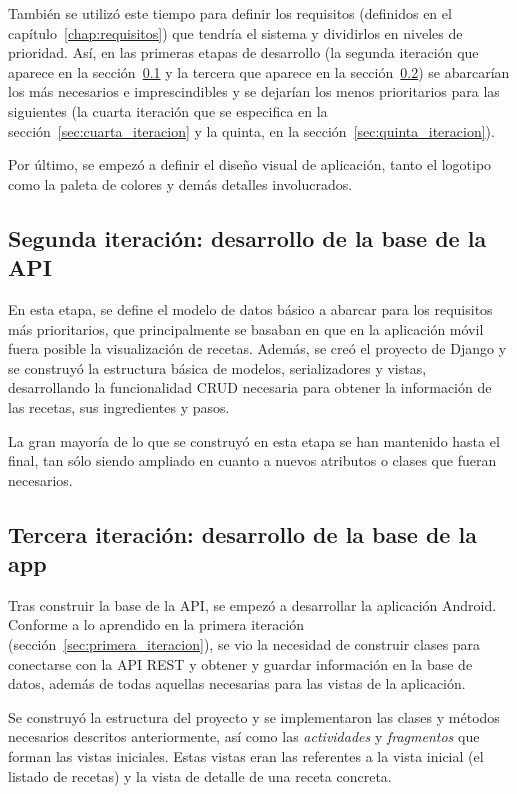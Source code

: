 También se utilizó este tiempo para definir los requisitos (definidos en el
capítulo~\ref{chap:requisitos}) que tendría el sistema y dividirlos en niveles
de prioridad. Así, en las primeras etapas de desarrollo (la segunda iteración que
aparece en la sección~\ref{sec:segunda_iteracion} y la tercera que aparece en la
sección~\ref{sec:tercera_iteracion}) se abarcarían los más necesarios e
imprescindibles y se dejarían los menos prioritarios para las siguientes (la
cuarta iteración que se especifica en la sección~\ref{sec:cuarta_iteracion} y
la quinta, en la sección~\ref{sec:quinta_iteracion}).

Por último, se empezó a definir el diseño visual de aplicación, tanto el
logotipo como la paleta de colores y demás detalles involucrados.


\subsection{Segunda iteración: desarrollo de la base de la API}
\label{sec:segunda_iteracion}

En esta etapa, se define el modelo de datos básico a abarcar para los requisitos
más prioritarios, que principalmente se basaban en que en la aplicación móvil
fuera posible la visualización de recetas. Además, se creó el proyecto de Django
y se construyó la estructura básica de modelos, serializadores y vistas,
desarrollando la funcionalidad CRUD necesaria para obtener la información de las
recetas, sus ingredientes y pasos.

La gran mayoría de lo que se construyó en esta etapa se han mantenido hasta el
final, tan sólo siendo ampliado en cuanto a nuevos atributos o clases que fueran
necesarios.


\subsection{Tercera iteración: desarrollo de la base de la app}
\label{sec:tercera_iteracion}

Tras construir la base de la API, se empezó a desarrollar la aplicación Android.
Conforme a lo aprendido en la primera iteración
(sección~\ref{sec:primera_iteracion}), se vio la necesidad de construir clases
para conectarse con la API \ac{REST} y obtener y guardar información
en la base de datos, además de todas aquellas necesarias para las vistas de la
aplicación.

Se construyó la estructura del proyecto y se implementaron las clases y métodos
necesarios descritos anteriormente, así como las \textit{actividades} y
\textit{fragmentos} que forman las vistas iniciales. Estas vistas eran las
referentes a la vista inicial (el listado de recetas) y la vista de detalle de
una receta concreta.



